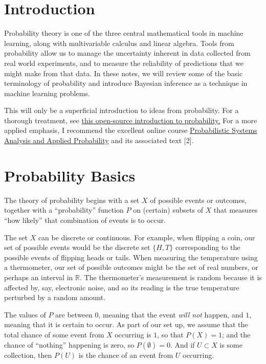 \documentclass[
  11pt,
  letterpaper,
]{scrbook}
\theoremstyle{plain}
\theoremstyle{plain}
\theoremstyle{remark}
\begin{document}
\hypertarget{introduction-1}{%
\section{Introduction}\label{introduction-1}}

Probability theory is one of the three central mathematical tools in
machine learning, along with multivariable calculus and linear algebra.
Tools from probability allow us to manage the uncertainty inherent in
data collected from real world experiments, and to measure the
reliability of predictions that we might make from that data. In these
notes, we will review some of the basic terminology of probability and
introduce Bayesian inference as a technique in machine learning
problems.

This will only be a superficial introduction to ideas from probability.
For a thorough treatment, see
\href{https://probability.oer.math.uconn.edu/3160-oer}{this open-source
introduction to probability.} For a more applied emphasis, I recommend
the excellent online course
\href{https://ocw.mit.edu/courses/electrical-engineering-and-computer-science/6-041-probabilistic-systems-analysis-and-applied-probability-fall-2010/}{Probabilistic
Systems Analysis and Applied Probability} and its associated text
{[}2{]}.

\hypertarget{probability-basics}{%
\section{Probability Basics}\label{probability-basics}}

The theory of probability begins with a set \(X\) of possible events or
outcomes, together with a ``probability'' function \(P\) on (certain)
subsets of \(X\) that measures ``how likely'' that combination of events
is to occur.

The set \(X\) can be discrete or continuous. For example, when flipping
a coin, our set of possible events would be the discrete set \(\{H,T\}\)
corresponding to the possible events of flipping heads or tails. When
measuring the temperature using a thermometer, our set of possible
outcomes might be the set of real numbers, or perhaps an interval in
\(\mathbb{R}\). The thermometer's measurement is random because it is
affected by, say, electronic noise, and so its reading is the true
temperature perturbed by a random amount.

The values of \(P\) are between \(0\), meaning that the event \emph{will
not} happen, and \(1\), meaning that it is certain to occur. As part of
our set up, we assume that the total chance of some event from \(X\)
occurring is \(1\), so that \(P(X)=1\); and the chance of ``nothing''
happening is zero, so \(P(\emptyset)=0\). And if \(U\subset X\) is some
collection, then \(P(U)\) is the chance of an event from \(U\)
occurring.
\end{document}
